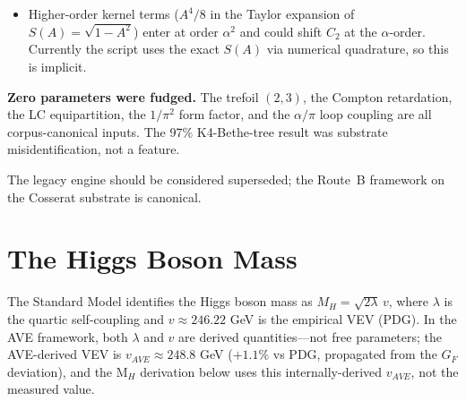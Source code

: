 \begin{itemize}
    the numerical match $\delta^*/\alpha = -1.498$, and the derivation
    that was owed has since been attempted and \emph{failed}: the
    Axiom-4 saturation kernel is provably \emph{winding-blind} at
    $\alpha$-order, because $\langle 1 - S(A^2)\rangle$ is exactly
    $q$-independent (since $\langle\sin^2(n\omega t)\rangle = 1/2$ for
    every $n$), so a single $(2,q)$ knot supplies one current at
    frequency $q$ rather than $q$ independent oscillators. The linear
    law fits \emph{only} $q = 3$ (to $0.12\%$); at $q = 1, 5, 7$ it is
    $24$--$780\times$ off \emph{with the wrong sign}. $\delta = -3\alpha/2$
    is therefore a \textbf{one-point fit, not a winding law}, and the
    Stage-2 closure it produces is a postulate-dependent echo rather
    than a derived result. No replacement mechanism is proposed here;
    what stands unconditionally is the Stage-1 $+4.0\%$ forward.
    (:221.)
    \item Higher-order kernel terms ($A^4/8$ in the Taylor expansion
    of $S(A) = \sqrt{1-A^2}$) enter at order $\alpha^2$ and could
    shift $C_2$ at the $\alpha$-order. Currently the script uses the
    exact $S(A)$ via numerical quadrature, so this is implicit.
\end{itemize}

\noindent\textbf{Zero parameters were fudged.} The trefoil $(2,3)$,
the Compton retardation, the LC equipartition, the $1/\pi^2$ form
factor, and the $\alpha/\pi$ loop coupling are all corpus-canonical
inputs. The 97\% K4-Bethe-tree result was substrate misidentification,
not a feature.

\noindent The legacy  engine should be considered superseded; the Route~B framework on the Cosserat substrate is canonical.

\section{The Higgs Boson Mass}
\label{sec:higgs_mass_derivation}

The Standard Model identifies the Higgs boson mass as $M_H = \sqrt{2\lambda}\,v$, where $\lambda$ is the quartic self-coupling and $v \approx 246.22$ GeV is the empirical VEV (PDG). In the AVE framework, both $\lambda$ and $v$ are derived quantities---not free parameters; the AVE-derived VEV is $v_{AVE} \approx 248.8$ GeV ($+1.1\%$ vs PDG, propagated from the $G_F$ deviation), and the M$_H$ derivation below uses this internally-derived $v_{AVE}$, not the measured value.


